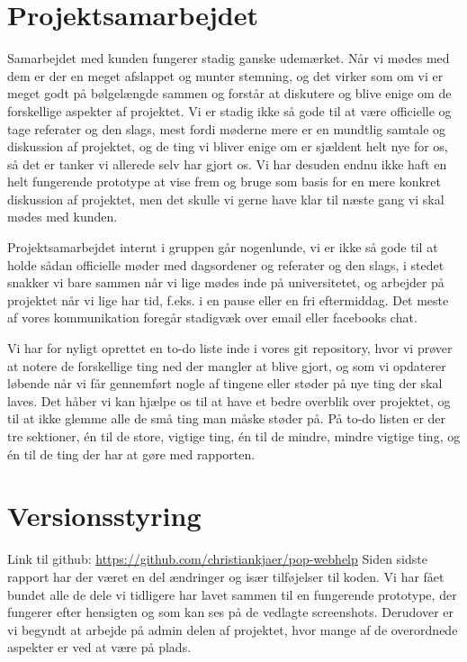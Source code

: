 \documentclass[11pt, a4paper]{article}
\begin{document}
\section{Projektsamarbejdet}
\label{sec:projektsamarbejdet}
Samarbejdet med kunden fungerer stadig ganske udemærket. Når vi mødes med dem er der en meget afslappet og munter stemning, og det virker som om vi er meget godt på bølgelængde sammen og forstår at diskutere og blive enige om de forskellige aspekter af projektet. Vi er stadig ikke så gode til at være officielle og tage referater og den slags, mest fordi møderne mere er en mundtlig samtale og diskussion af projektet, og de ting vi bliver enige om er sjældent helt nye for os, så det er tanker vi allerede selv har gjort os. Vi har desuden endnu ikke haft en helt fungerende prototype at vise frem og bruge som basis for en mere konkret diskussion af projektet, men det skulle vi gerne have klar til næste gang vi skal mødes med kunden. 

Projektsamarbejdet internt i gruppen går nogenlunde, vi er ikke så gode til at holde sådan officielle møder  med dagsordener og referater og den slags, i stedet snakker vi bare sammen når vi lige mødes inde på universitetet, og arbejder på projektet når vi lige har tid, f.eks. i en pause eller en fri eftermiddag. Det meste af vores kommunikation foregår stadigvæk over email eller facebooks chat. 

Vi har for nyligt oprettet en to-do liste inde i vores git repository, hvor vi prøver at notere de forskellige ting ned der mangler at blive gjort, og som vi opdaterer løbende når vi får gennemført nogle af tingene eller støder på nye ting der skal laves. Det håber vi kan hjælpe os til at have et bedre overblik over projektet, og til at ikke glemme alle de små ting man måske støder på. På to-do listen er der tre sektioner, én til de store, vigtige ting, én til de mindre, mindre vigtige ting, og én til de ting der har at gøre med rapporten.

\newpage
\appendix
\section{Versionsstyring}
\label{sec:versionsstyring}
Link til github: \url{https://github.com/christiankjaer/pop-webhelp}
Siden sidste rapport har der været en del ændringer og især tilføjelser til koden. Vi har fået bundet alle de dele vi tidligere har lavet sammen til en fungerende prototype, der fungerer efter hensigten og som kan ses på de vedlagte screenshots. Derudover er vi begyndt at arbejde på admin delen af projektet, hvor mange af de overordnede aspekter er ved at være på plads.
\end{document}
